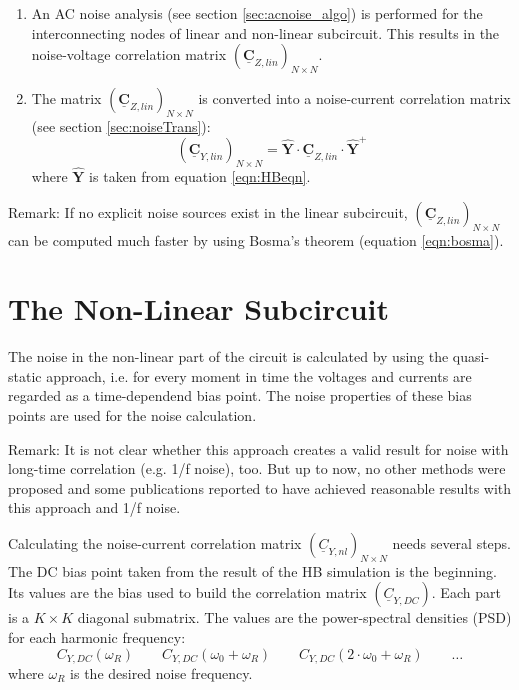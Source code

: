 \begin{enumerate}
\item An AC noise analysis (see section \ref{sec:acnoise_algo}) is
   performed for the interconnecting nodes of linear and non-linear
   subcircuit. This results in the noise-voltage correlation matrix
   $(\boldsymbol{\underline{C}}_{Z,lin})_{N\times N}$.
\item The matrix $(\boldsymbol{\underline{C}}_{Z,lin})_{N\times N}$
   is converted into a noise-current correlation matrix (see section
   \ref{sec:noiseTrans}):
   \begin{equation}
     (\boldsymbol{\underline{C}}_{Y,lin})_{N\times N} =
     \boldsymbol{\hat{Y}} \cdot
     \boldsymbol{\underline{C}}_{Z,lin} \cdot
     \boldsymbol{\hat{Y}}^+
   \end{equation}
   where $\boldsymbol{\hat{Y}}$ is taken from equation \ref{eqn:HBeqn}.
\end{enumerate}

Remark: If no explicit noise sources exist in the linear subcircuit,
$(\boldsymbol{\underline{C}}_{Z,lin})_{N\times N}$ can be computed
much faster by using Bosma's theorem (equation \ref{eqn:bosma}).


\section{The Non-Linear Subcircuit}

The noise in the non-linear part of the circuit is calculated
by using the quasi-static approach, i.e. for every moment in
time the voltages and currents are regarded as a time-dependend
bias point. The noise properties of these bias points are
used for the noise calculation.

\addvspace{12pt}

Remark: It is not clear whether this approach creates a valid result
for noise with long-time correlation (e.g. 1/f noise), too. But up
to now, no other methods were proposed and some publications
reported to have achieved reasonable results with this approach
and 1/f noise.

\addvspace{12pt}

Calculating the noise-current correlation matrix $(\underline{C}_{Y,nl})_{N\times N}$
needs several steps. The DC bias point taken from the result of the
HB simulation is the beginning. Its values are the bias used to build
the correlation matrix $(\underline{C}_{Y,DC})$. Each part is a $K\times K$
diagonal submatrix. The values are the power-spectral densities (PSD)
for each harmonic frequency:
\begin{equation}
C_{Y,DC}(\omega_R) \qquad C_{Y,DC}(\omega_0 + \omega_R) \qquad
C_{Y,DC}(2\cdot\omega_0 + \omega_R) \qquad \dots
\end{equation}
where $\omega_R$ is the desired noise frequency.

